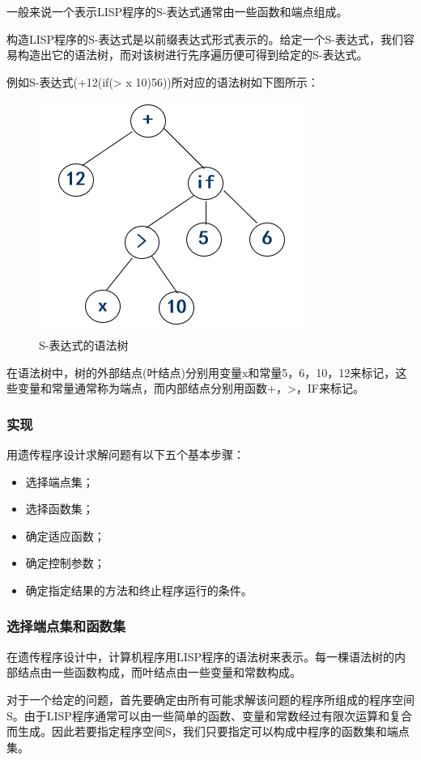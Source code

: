 \documentclass[UTF8]{ctexart}
\begin{document}
一般来说一个表示LISP程序的S-表达式通常由一些函数和端点组成。

构造LISP程序的S-表达式是以前缀表达式形式表示的。给定一个S-表达式，我们容易构造出它的语法树，而对该树进行先序遍历便可得到给定的S-表达式。

例如S-表达式(+12(if(> x 10)56))所对应的语法树如下图所示：
\begin{figure}[ht]
	\centering	
	\includegraphics[scale=0.3]{images/syntactic_tree.png}
	\caption{S-表达式的语法树}
	\label{fig:label}
\end{figure}

\newpage
在语法树中，树的外部结点(叶结点)分别用变量x和常量5，6，10，12来标记，这些变量和常量通常称为端点，而内部结点分别用函数+，>，IF来标记。

\subsubsection{实现}
用遗传程序设计求解问题有以下五个基本步骤：
\begin{itemize}		
	\item 选择端点集；
	\item 选择函数集；
	\item 确定适应函数；
	\item 确定控制参数；
	\item 确定指定结果的方法和终止程序运行的条件。
\end{itemize}

\subsubsection{选择端点集和函数集}	
	在遗传程序设计中，计算机程序用LISP程序的语法树来表示。每一棵语法树的内部结点由一些函数构成，而叶结点由一些变量和常数构成。
	
	对于一个给定的问题，首先要确定由所有可能求解该问题的程序所组成的程序空间S。由于LISP程序通常可以由一些简单的函数、变量和常数经过有限次运算和复合而生成。因此若要指定程序空间S，我们只要指定可以构成中程序的函数集和端点集。
	
\end{document}
